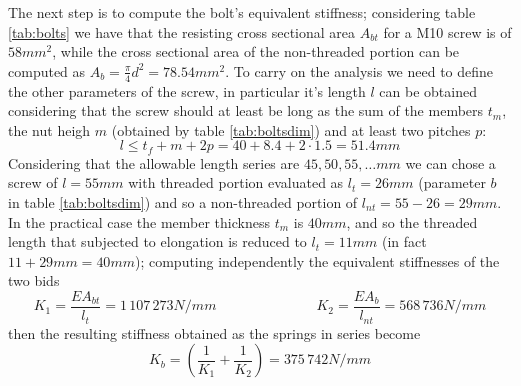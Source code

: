 	The next step is to compute the bolt's equivalent stiffness; considering table \ref{tab:bolts} we have that the resisting cross sectional area $A_{bt}$ for a M10 screw is of $58mm^2$, while the cross sectional area of the non-threaded portion can be computed as $A_b = \frac \pi 4 d^2 = 78.54mm^2$. To carry on the analysis we need to define the other parameters of the screw, in particular it's length $l$ can be obtained considering that the screw should at least be long as the sum of the members $t_m$, the nut heigh $m$ (obtained by table \ref{tab:boltsdim}) and at least two pitches $p$:
	\[ l \leq t_f+ m + 2p = 40 +8.4 +2\cdot 1.5 = 51.4mm \]
	Considering that the allowable length series are $45,50,55,\dots mm$ we can chose a screw of $l=55mm$ with threaded portion evaluated as $l_t = 26mm$ (parameter $b$ in table \ref{tab:boltsdim}) and so a non-threaded portion of $l_{nt} = 55- 26 = 29mm$. In the practical case the member thickness $t_m$ is $40mm$, and so the threaded length that subjected to elongation is reduced to $l_t = 11 mm$ (in fact $11+29mm = 40mm$); computing independently the equivalent stiffnesses of the two bids
	\[ K_1 = \frac{E A_{bt}}{l_t} = 1\,107\,273 N/mm \hspace{3cm} K_2 = \frac{E A_{b}}{l_{nt}} = 568\,736 N/mm \]
	then the resulting stiffness obtained as the springs in series become
	\[ K_b = \left(\frac{1}{K_1} + \frac1 {K_2}\right) = 375\, 742 N/mm \]
	
